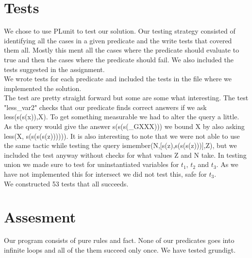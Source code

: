 \documentclass[]{article}
\begin{document}
\section{Tests} %
\label{sec:tests}
We chose to use PLunit to test our solution. Our testing strategy consisted of identifying all the cases in a given predicate and the write tests that covered them all. Mostly this ment all the cases where the predicate should evaluate to true and then the cases where the predicate should fail. We also included the tests suggested in the assignment. \\
We wrote tests for each predicate and included the tests in the file where we implemented the solution. \\
The test are pretty straight forward but some are some what interesting. The test "less_var2" checks that our predicate finds correct answers if we ask less(s(s(x)),X). To get something measurable we had to alter the query a little. As the query would give the answer s(s(s(_GXXX))) we bound X by also asking less(X, s(s(s(s(z)))))). It is also interesting to note that we were not able to use the same tactic while testing the query ismember(N,[s(z),s(s(s(z)))],Z), but we included the test anyway without checks for what values Z and N take. In testing union we made sure to test for uninstantiated variables for $t_1$, $t_2$ and $t_3$. As we have not implemented this for intersect we did not test this, safe for $t_3$.\\
We constructed 53 tests that all succeeds.

\section{Assesment} %
\label{sec:assesment}
Our program consists of pure rules and fact. None of our predicates goes into infinite loops and all of the them succeed only once.
We have tested grundigt.



\end{document}
